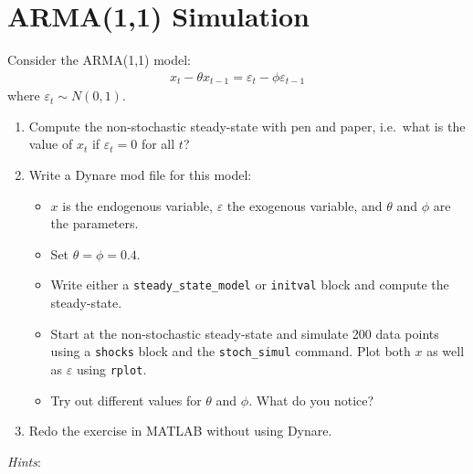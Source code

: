 \section[ARMA{(1,1)} Simulation]{ARMA{(1,1)} Simulation\label{ex:ARMASimulation}}
Consider the ARMA{(1,1)} model:
\begin{align*}
x_t - \theta x_{t-1} = \varepsilon_t - \phi \varepsilon_{t-1}
\end{align*}
where \(\varepsilon_t \sim N(0,1)\).

\begin{enumerate}

\item
Compute the non-stochastic steady-state with pen and paper,
  i.e.\ what is the value of \(x_t\) if \(\varepsilon_t = 0\) for all \(t\)?

\item
Write a Dynare mod file for this model:

\begin{itemize}

\item
\(x\) is the endogenous variable, \({\varepsilon}\) the exogenous variable, and \({\theta}\) and \({\phi}\) are the parameters.

\item
Set \(\theta = \phi = 0.4\).

\item
Write either a \texttt{steady\_state\_model} or \texttt{initval} block and compute the steady-state.

\item
Start at the non-stochastic steady-state and simulate 200 data points using a \texttt{shocks} block
  and the \texttt{stoch\_simul} command.
Plot both \(x\) as well as \({\varepsilon}\) using \texttt{rplot}.

\item
Try out different values for \({\theta}\) and \({\phi}\).
What do you notice?

\end{itemize}

\item
Redo the exercise in MATLAB without using Dynare.

\end{enumerate}

\emph{Hints}:

